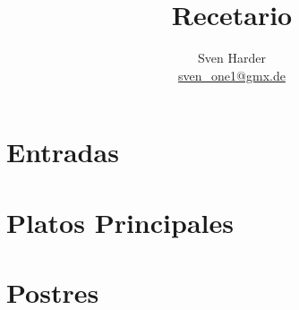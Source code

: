 \documentclass[%
a4paper,
11pt
]{article}
\begin{document}
\title{Recetario}
\author{Sven Harder\\ \href{mailto:sven\_one1@gmx.de}{sven\_one1@gmx.de}}


\tableofcontents

\vspace{5em}

\section{Entradas}



\section{Platos Principales}


%








\section{Postres}



\end{document}
